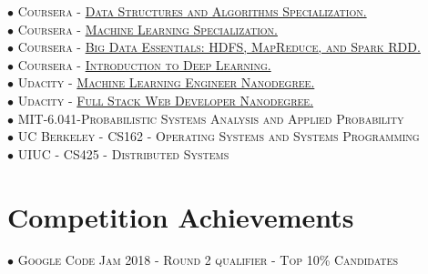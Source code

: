 \documentclass[10pt]{article}
\begin{document}
        $\bullet$ \textsc{Coursera - \href{https://www.coursera.org/account/accomplishments/specialization/certificate/AKFYZQ9QD8XH}{Data Structures and Algorithms Specialization.}} \\
        $\bullet$ \textsc{Coursera - \href{https://www.coursera.org/account/accomplishments/specialization/certificate/ZUGAFYKCMQ79}{Machine Learning Specialization.}} \\
        $\bullet$ \textsc{Coursera - \href{https://www.coursera.org/account/accomplishments/certificate/G25TQPPNXGW5}{Big Data Essentials: HDFS, MapReduce, and Spark RDD.}} \\
        $\bullet$ \textsc{Coursera - \href{https://www.coursera.org/account/accomplishments/certificate/XN2B7T4AJX8C}{Introduction to Deep Learning.}} \\
        $\bullet$ \textsc{Udacity - \href{https://graduation.udacity.com/confirm/HK9JLR3N}{Machine Learning Engineer Nanodegree.}} \\
        $\bullet$ \textsc{Udacity - \href{https://graduation.udacity.com/confirm/KPSCQGZK}{Full Stack Web Developer Nanodegree.}} \\
        $\bullet$ \textsc{MIT-6.041-Probabilistic Systems Analysis and Applied Probability} \\
        $\bullet$ \textsc{UC Berkeley - CS162 - Operating Systems and Systems Programming} \\
        $\bullet$ \textsc{UIUC - CS425 - Distributed Systems}

    \section{Competition Achievements}
        \vspace{-2mm}

        $\bullet$ \textsc{Google Code Jam 2018 - Round 2 qualifier - Top 10\% Candidates}
\end{document}
